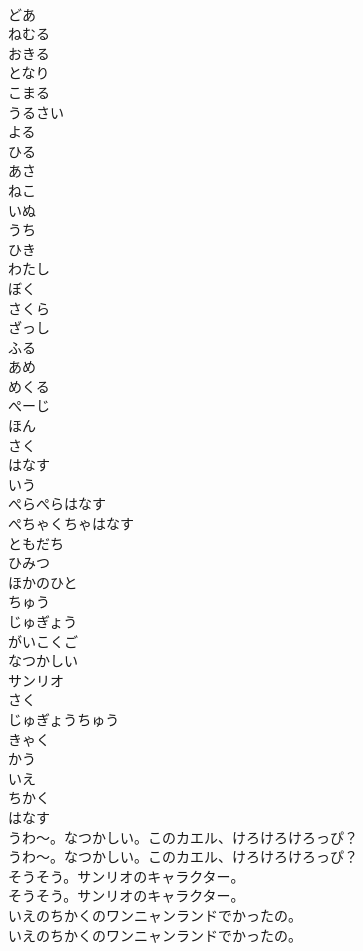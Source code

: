\documentclass[8pt]{extreport}
\begin{document}
\begin{CJK}{UTF8}{min}
\\	どあ
\\	ねむる
\\	おきる
\\	となり
\\	こまる
\\	うるさい
\\	よる
\\	ひる
\\	あさ
\\	ねこ
\\	いぬ
\\	うち
\\	ひき
\\	わたし
\\	ぼく
\\	さくら
\\	ざっし
\\	ふる
\\	あめ
\\	めくる
\\	ぺーじ
\\	ほん
\\	さく
\\	はなす
\\	いう
\\	ぺらぺらはなす
\\	ぺちゃくちゃはなす
\\	ともだち
\\	ひみつ
\\	ほかのひと
\\	ちゅう
\\	じゅぎょう
\\	がいこくご
\\	なつかしい
\\	サンリオ
\\	さく
\\	じゅぎょうちゅう
\\	きゃく
\\	かう
\\	いえ
\\	ちかく
\\	はなす
\\	うわ～。なつかしい。このカエル、けろけろけろっぴ？
\\	うわ～。なつかしい。このカエル、けろけろけろっぴ？
\\	そうそう。サンリオのキャラクター。
\\	そうそう。サンリオのキャラクター。
\\	いえのちかくのワンニャンランドでかったの。
\\	いえのちかくのワンニャンランドでかったの。

\end{CJK}
\end{document}
